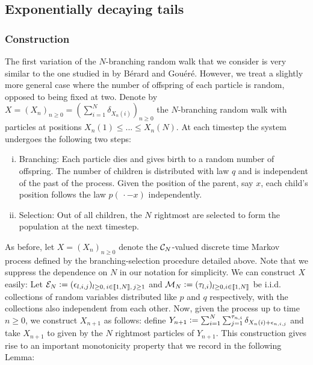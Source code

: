\subsection{Exponentially decaying tails}
\subsubsection{Construction}

The first variation of the $N$-branching random walk that we consider is very similar to the one studied in \cite{exp_tails} by Bérard and Gouéré. However, we treat a slightly more general case where the number of offspring of each particle is random, opposed to being fixed at two. Denote by $X = (X_n)_{n \geq 0} = (\sum_{i = 1}^N \delta_{X_n(i)})_{n \geq 0}$ the $N$-branching random walk with particles at positions $X_n(1) \leq ... \leq X_n(N)$. At each timestep the system undergoes the following two steps:
\begin{enumerate}[(i)]
\item Branching: Each particle dies and gives birth to a random number of offspring. The number of children is distributed with law $q$ and is independent of the past of the process. Given the position of the parent, say $x$, each child's position follows the law $p(\,\cdot - x)$ independently. 
\item Selection: Out of all children, the $N$ rightmost are selected to form the population at the next timestep. 
\end{enumerate}

\begin{construction} As before, let $X = (X_n)_{n \geq 0}$ denote the $\cal{C}_N$-valued discrete time Markov process defined by the branching-selection procedure detailed above. Note that we suppress the dependence on $N$ in our notation for simplicity. We can construct $X$ easily: Let $\cal{E}_N \defeq (\epsilon_{l, i, j})_{l \geq 0,\,i \in \bbracket{1,N},\,j \geq 1}$ and $\cal{M}_N \defeq (\tau_{l, i})_{l \geq 0, i \in \bbracket{1, N}}$ be i.i.d. collections of random variables distributed like $p$ and $q$ respectively, with the collections also independent from each other. Now, given the process up to time $n \geq 0$, we construct $X_{n+1}$ as follows: define $Y_{n+1} \defeq \sum_{i = 1}^N \sum_{j=1}^{\tau_{n, i}} \delta_{X_n(i) + \epsilon_{n, i, j}}$ and take $X_{n+1}$ to given by the $N$ rightmost particles of $Y_{n+1}$. This construction gives rise to an important monotonicity property that we record in the following Lemma:
\end{construction}

